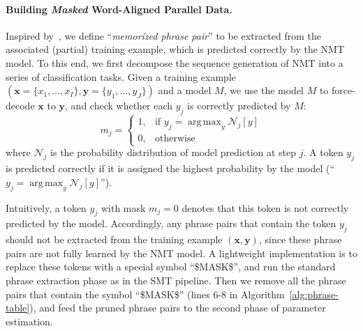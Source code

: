 \documentclass[11pt,a4paper]{article}
\DeclareMathOperator*{\argmax}{arg\,max}
\begin{document}
\paragraph{Building {\em Masked} Word-Aligned Parallel Data.}
Inspired by~, we define ``{\em memorized phrase pair}'' to be extracted from the associated (partial) training example, which is predicted correctly by the NMT model.
To this end, we first decompose the sequence generation of NMT into a series of classification tasks. Given a training example $(\textbf{x} = \{x_1, \dots, x_I\}, \textbf{y} = \{y_1, \dots, y_J\})$ and a model $M$, we use the model $M$ to force-decode $\textbf{x}$ to $\textbf{y}$, and check whether each $y_j$ is correctly predicted by $M$:
\[m_j= 
\begin{cases}
    1, & \text{if } y_j = \argmax_y \mathcal{N}_j[y] \\
    0,              & \text{otherwise}
\end{cases}
\]
where $\mathcal{N}_j$ is the probability distribution of model prediction at step $j$. A token $y_j$ is predicted correctly if it is assigned the highest probability by the model (``$y_j = \argmax_y \mathcal{N}_j[y]$''). 

Intuitively, a token $y_j$ with mask $m_j=0$ denotes that this token is not correctly predicted by the model. Accordingly, any phrase pairs that contain the token $y_j$ should not be extracted from the training example $(\textbf{x}, \textbf{y})$, since these phrase pairs are not fully learned by the NMT model. A lightweight implementation is to replace these tokens with a special symbol ``\$MASK\$'', and run the standard phrase extraction phase as in the SMT pipeline. Then we remove all the phrase pairs that contain the symbol ``\$MASK\$'' (lines 6-8 in Algorithm~\ref{alg:phrase-table}), and feed the pruned phrase pairs to the second phase of parameter estimation. 
\end{document}
